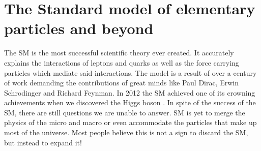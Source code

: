 \chapter{The Standard model of elementary particles and beyond}

The \ac{SM} is the most successful scientific theory ever
created. It accurately explains the interactions of leptons and quarks as well as the force
carrying particles which mediate said interactions. The model is a result of over a century of work
demanding the contributions of great minds like Paul Dirac, Erwin Schrodinger and Richard Feynman.
In 2012 the SM achieved one of its crowning achievements when we discovered the Higgs boson \cite{Aad_2012}. 
In spite of the success of the \ac{SM}, there are still questions we are unable to answer.
\ac{SM} is yet to merge the physics of the micro and macro or even accommodate the particles that make
up most of the universe. Most people believe this is not a sign to discard the \ac{SM}, but instead to expand it!